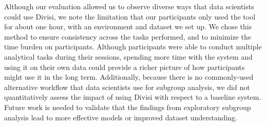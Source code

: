 Although our evaluation allowed us to observe diverse ways that data scientists could use Divisi, we note the limitation that our participants only used the tool for about one hour, with an environment and dataset we set up. 
We chose this method to ensure consistency across the tasks performed, and to minimize the time burden on participants.
Although participants were able to conduct multiple analytical tasks during their sessions, spending more time with the system and using it on their own data could provide a richer picture of how participants might use it in the long term.
Additionally, because there is no commonly-used alternative workflow that data scientists use for subgroup analysis, we did not quantitatively assess the impact of using Divisi with respect to a baseline system.
Future work is needed to validate that the findings from exploratory subgroup analysis lead to more effective models or improved dataset understanding.

